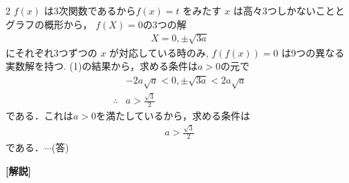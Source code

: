 \documentclass[../../../../main.tex]{subfiles}
\begin{document}
\begin{multicols}{2}
  $f(x)$ は3次関数であるから$f(x)=t$ をみたす $x$ は高々3つしかないこととグラフの概形から，
  $f(X)=0$の3つの解
  \begin{align*}
    X = 0, \pm \sqrt{3a}
  \end{align*}
  にそれぞれ3つずつの $x$ が対応している時のみ, $f(f(x))=0$ は9つの異なる実数解を持つ.
  (1)の結果から，求める条件は$a>0$の元で
  \begin{align*}
     & -2a\sqrt{a} < 0, \pm\sqrt{3a} < 2a\sqrt{a} \\
    \therefore
     & a > \frac{\sqrt{3}}{2}
  \end{align*}
  である．これは$a>0$を満たしているから，求める条件は
  \begin{align*}
    a > \frac{\sqrt{3}}{2}
  \end{align*}
  である．$\cdots$(答)

  \vspace{10pt}

  {\bf[解説]}

  \newpage
\end{multicols}
\end{document}
